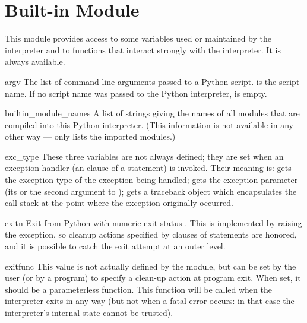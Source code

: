 \section{Built-in Module }

This module provides access to some variables used or maintained by the
interpreter and to functions that interact strongly with the interpreter.
It is always available.

\renewcommand{\indexsubitem}{(in module sys)}
\begin{datadesc}{argv}
  The list of command line arguments passed to a Python script.
   is the script name.
  If no script name was passed to the Python interpreter,
   is empty.
\end{datadesc}

\begin{datadesc}{builtin_module_names}
  A list of strings giving the names of all modules that are compiled
  into this Python interpreter.  (This information is not available in
  any other way ---  only lists the imported
  modules.)
\end{datadesc}

\begin{datadesc}{exc_type}
  These three variables are not always defined; they are set when an
  exception handler (an  clause of a  statement) is
  invoked.  Their meaning is:  gets the exception type of
  the exception being handled;  gets the exception
  parameter (its  or the second argument to
  );  gets a traceback object which
  encapsulates the call stack at the point where the exception
  originally occurred.
\end{datadesc}

\begin{funcdesc}{exit}{n}
  Exit from Python with numeric exit status .  This is
  implemented by raising the  exception, so cleanup
  actions specified by  clauses of  statements
  are honored, and it is possible to catch the exit attempt at an outer
  level.
\end{funcdesc}

\begin{datadesc}{exitfunc}
  This value is not actually defined by the module, but can be set by
  the user (or by a program) to specify a clean-up action at program
  exit.  When set, it should be a parameterless function.  This function
  will be called when the interpreter exits in any way (but not when a
  fatal error occurs: in that case the interpreter's internal state
  cannot be trusted).
\end{datadesc}

